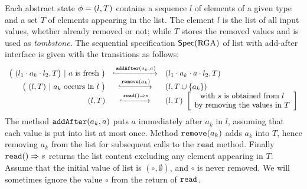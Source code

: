 \begin{example}
  \label{definition:sequential specification of rga}
  Each abstract state $\abstate = (l,T)$ contains a sequence $l$ of
  elements of a given type and a set $T$ of elements appearing in the
  list.
  The element $l$ is the list of all input values, whether already
  removed or not; while $T$ stores the removed values and is used as
  \emph{tombstone}.
  The sequential specification $\specRGA$ of list with add-after interface is
  given with the transitions as follows:
  \[
    \begin{array}{rcl}
      \big(\ (l_1 \cdot a_k \cdot l_2,T\big)\ |\ a\text{ is fresh}\ \big)
      & \specarrow{\alabelshort[\mathtt{addAfter}]{a_k,a}}
      & (l_1 \cdot a_k \cdot a \cdot l_2,T)\\
      \big(\ (l,T)\ |\ a_k\ \text{occurs in}\ l\ \big)
      & \specarrow{\alabelshort[\mathtt{remove}]{a_k}}
      & (l,T \cup \{a_k\})\\
      (l,T)
      & \specarrow{\alabellong[\mathtt{read}]{}{s}{}}
      & (l,T)\
        \left[\begin{array}{c}
                 \text{with $s$ is obtained from $l$}\\
                 \text{by removing the values in $T$}
        \end{array}\right]
 \end{array}
  \]
The method $\alabelshort[\mathtt{addAfter}]{a_k,a}$ puts $a$ immediately
  after $a_k$ in $l$, assuming that each value is put into list at
  most once.
  Method $\alabelshort[\mathtt{remove}]{a_k}$ adds $a_k$ into $T$,
  hence removing $a_k$ from the list for subsequent calls to the
  $\mathtt{read}$ method.
  Finally $\alabellong[\mathtt{read}]{}{s}{}$ returns the list content
  excluding any element appearing in $T$.
  Assume that the initial value of list is $(\circ,\emptyset)$, and
  $\circ$ is never removed.
  We will sometimes ignore the value $\circ$ from the return of
  $\ensuremath{\tt read}$.
\end{example}

